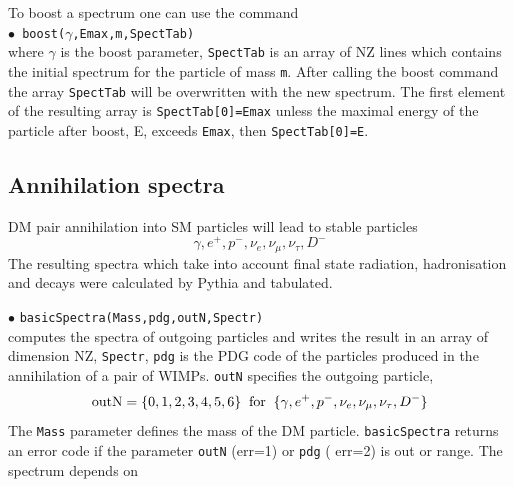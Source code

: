 \documentclass[12pt,a4paper]{article}
\begin{document}
To boost a spectrum one can use the command \\
$\bullet$\verb| boost(|$\gamma$\verb|,Emax,m,SpectTab)|\\
where $\gamma$ is the boost parameter, {\tt SpectTab} is an array of NZ lines which contains the initial spectrum  for the particle of mass \verb|m|. After calling the boost command  the array  {\tt SpectTab} will be overwritten with the new spectrum. The first element of the resulting array is {\tt SpectTab[0]=Emax} unless the maximal energy of the particle after boost, E,  exceeds {\tt Emax}, then {\tt SpectTab[0]=E}.


\subsection{Annihilation spectra}
\label{A_Spectra}

DM pair  annihilation into  SM particles will lead to stable particles
\begin{equation}
\label{outN} 
  \gamma,   e^+,  p^-, \nu_e, \nu_{\mu},\nu_\tau,D^-
\end{equation}
The resulting spectra which take into account final state radiation, hadronisation  and decays were  calculated by Pythia and tabulated. 

\noindent
$\bullet$ \verb|basicSpectra(Mass,pdg,outN,Spectr)|\\
computes the spectra of outgoing particles and writes the result in an array of dimension NZ, \verb|Spectr|,
\verb|pdg| is the PDG code of the particles produced in the annihilation of a pair of 
WIMPs.  \verb|outN|  specifies the outgoing particle,
$$ {\rm outN} = \{0,1,2,3,4,5,6\} \;\; {\rm for}\;\; \{\gamma,   e^+,  p^-, \nu_e,
\nu_{\mu},\nu_{\tau},D^-\} $$
The {\tt Mass} parameter defines the mass of the DM particle. {\tt basicSpectra} returns an error code if the  parameter {\tt outN} (err=1) or {\tt pdg} ( err=2) is out or range.   
The spectrum  depends on  



\end{document}

